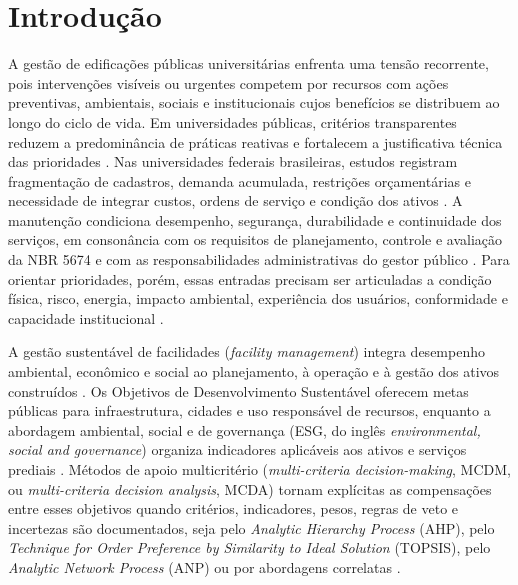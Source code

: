 \section{Introdução}
\label{sec:introducao}

A gestão de edificações públicas universitárias enfrenta uma tensão recorrente, pois intervenções visíveis ou urgentes competem por recursos com ações preventivas, ambientais, sociais e institucionais cujos benefícios se distribuem ao longo do ciclo de vida. Em universidades públicas, critérios transparentes reduzem a predominância de práticas reativas e fortalecem a justificativa técnica das prioridades \parencite{lateef_manutencaouniversidade_2010,barbosa_facilitiesinstituicaopublica_2020}. Nas universidades federais brasileiras, estudos registram fragmentação de cadastros, demanda acumulada, restrições orçamentárias e necessidade de integrar custos, ordens de serviço e condição dos ativos \parencite{barbosa_facilitiesinstituicaopublica_2020,martins_custosmanutencaoses_2024,morais_eficienciamanutencao_2023}. A manutenção condiciona desempenho, segurança, durabilidade e continuidade dos serviços, em consonância com os requisitos de planejamento, controle e avaliação da NBR 5674 e com as responsabilidades administrativas do gestor público \parencite{abnt_nbr5674_2012,araujoneto_manutencaolegislacao_2015}. Para orientar prioridades, porém, essas entradas precisam ser articuladas a condição física, risco, energia, impacto ambiental, experiência dos usuários, conformidade e capacidade institucional \parencite{maia_gestaoinformacaomanutencao_2016,nageli_ciclovida_2019,alfalah_frameworkeducacional_2022}.

A gestão sustentável de facilidades (\textit{facility management}) integra desempenho ambiental, econômico e social ao planejamento, à operação e à gestão dos ativos construídos \parencite{nielsen_sustentabilidadefm_2016,opoku_futurofm_2022,okoro_sustainablefm_2023}. Os Objetivos de Desenvolvimento Sustentável oferecem metas públicas para infraestrutura, cidades e uso responsável de recursos, enquanto a abordagem ambiental, social e de governança (ESG, do inglês \textit{environmental, social and governance}) organiza indicadores aplicáveis aos ativos e serviços prediais \parencite{okoro_sustainablefm_2023,ramantswana_esgfm_2026}. Métodos de apoio multicritério (\textit{multi-criteria decision-making}, MCDM, ou \textit{multi-criteria decision analysis}, MCDA) tornam explícitas as compensações entre esses objetivos quando critérios, indicadores, pesos, regras de veto e incertezas são documentados, seja pelo \textit{Analytic Hierarchy Process} (AHP), pelo \textit{Technique for Order Preference by Similarity to Ideal Solution} (TOPSIS), pelo \textit{Analytic Network Process} (ANP) ou por abordagens correlatas \parencite{alfalah_frameworkeducacional_2022,naji_campusdelphi_2023,masmoudi_ahptopsis_2026}.

